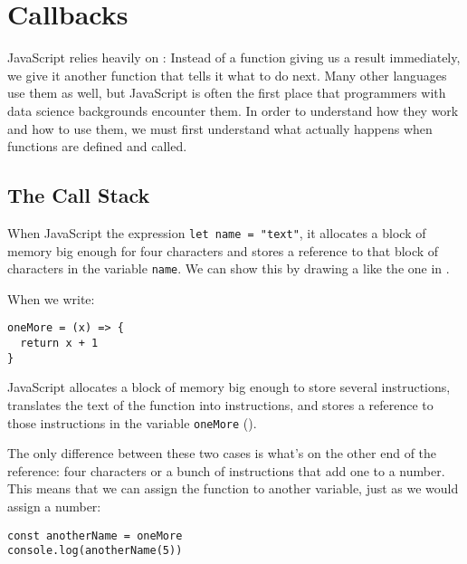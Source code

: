 \chapter{Callbacks}\label{s:callbacks}

JavaScript relies heavily on :
Instead of a function giving us a result immediately,
we give it another function that tells it what to do next.
Many other languages use them as well,
but JavaScript is often the first place that programmers with data science backgrounds encounter them.
In order to understand how they work and how to use them,
we must first understand what actually happens when functions are defined and called.

\section{The Call Stack}\label{s:callbacks-callstack}

When JavaScript  the expression \texttt{let\ name\ =\ "text"},
it allocates a block of memory big enough for four characters
and stores a reference to that block of characters in the variable \texttt{name}.
We can show this by drawing a 
like the one in .


When we write:

\begin{verbatim}
oneMore = (x) => {
  return x + 1
}
\end{verbatim}

JavaScript allocates a block of memory big enough to store several instructions,
translates the text of the function into instructions,
and stores a reference to those instructions in the variable \texttt{oneMore}
().


The only difference between these two cases is what's on the other end of the reference:
four characters or a bunch of instructions that add one to a number.
This means that we can assign the function to another variable,
just as we would assign a number:

\begin{verbatim}
const anotherName = oneMore
console.log(anotherName(5))
\end{verbatim}

